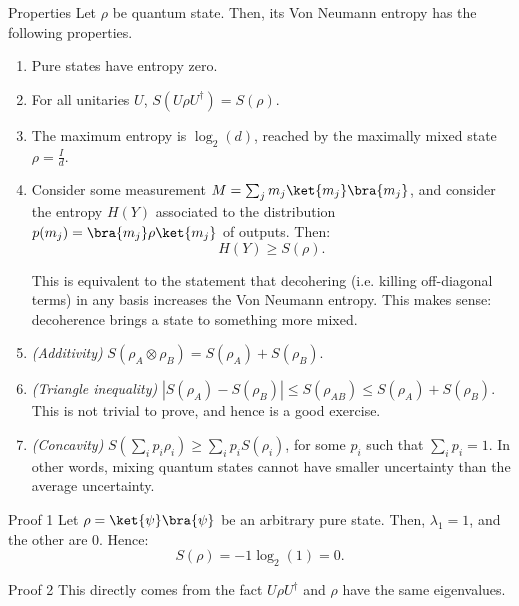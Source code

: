 \documentclass[a4paper]{article}
\begin{document}
\begin{parag}{Properties}
    Let $\rho$ be quantum state. Then, its Von Neumann entropy has the following properties.
    \begin{enumerate}
        \item Pure states have entropy zero.
        \item For all unitaries $U$, $S\left(U \rho U^{\dagger}\right) = S\left(\rho\right)$.
        \item The maximum entropy is $\log_2\left(d\right)$, reached by the maximally mixed state $\rho = \frac{I}{d}$.
        \item Consider some measurement $M = \sum_{j} m_j \ket{m_j}\bra{m_j}$, and consider the entropy $H\left(Y\right)$ associated to the distribution $p\left(m_j\right) = \bra{m_j} \rho \ket{m_j}$ of outputs. Then: 
        \[H\left(Y\right) \geq S\left(\rho\right).\]

        This is equivalent to the statement that decohering (i.e. killing off-diagonal terms) in any basis increases the Von Neumann entropy. This makes sense: decoherence brings a state to something more mixed.
        \item \textit{(Additivity)} $S\left(\rho_A \otimes \rho_B\right) = S\left(\rho_A\right) + S\left(\rho_B\right)$.
        \item \textit{(Triangle inequality)} $\left|S\left(\rho_A\right) - S\left(\rho_B\right)\right| \leq S\left(\rho_{AB}\right) \leq S\left(\rho_A\right) + S\left(\rho_B\right)$. This is not trivial to prove, and hence is a good exercise.
        \item \textit{(Concavity)} $S\left(\sum_{i} p_i \rho_i\right) \geq \sum_{i} p_i S\left(\rho_i\right)$, for some $p_i$ such that $\sum_{i} p_i = 1$. In other words, mixing quantum states cannot have smaller uncertainty than the average uncertainty.
    \end{enumerate}
    
    \begin{subparag}{Proof 1}
        Let $\rho = \ket{\psi}\bra{\psi}$ be an arbitrary pure state. Then, $\lambda_1 = 1$, and the other are 0. Hence: 
        \[S\left(\rho\right) = -1 \log_2\left(1\right) = 0.\]
    \end{subparag}

    \begin{subparag}{Proof 2}
        This directly comes from the fact $U \rho U^{\dagger}$ and $\rho$ have the same eigenvalues.
    \end{subparag}
\end{parag}
\end{document}
